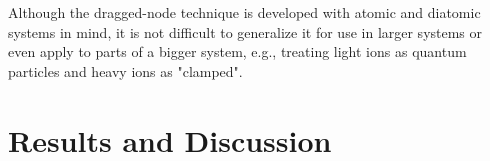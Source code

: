\documentclass[pra,superscriptaddress,groupedaddress,twocolumn]{revtex4}
\begin{document}
Although the dragged-node technique is developed with atomic and diatomic systems in mind, it is not difficult to generalize it for use in larger systems or even apply to parts of a bigger system, e.g., treating light ions as quantum particles and heavy ions as "clamped". %

\section{Results and Discussion}
\end{document}
